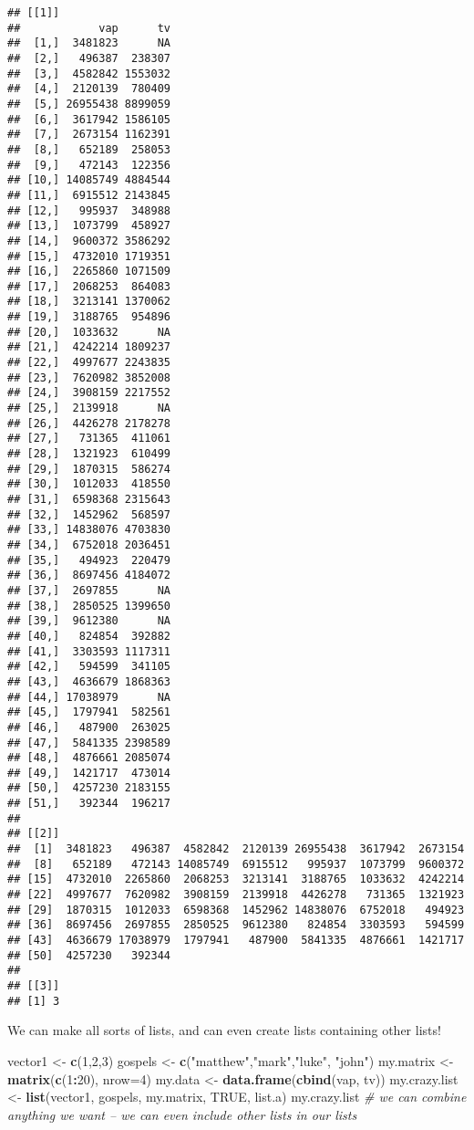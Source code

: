 \documentclass[]{article}
\newenvironment{Shaded}{\begin{snugshade}}{\end{snugshade}}
\newcommand{\KeywordTok}[1]{\textcolor[rgb]{0.13,0.29,0.53}{\textbf{#1}}}
\newcommand{\DataTypeTok}[1]{\textcolor[rgb]{0.13,0.29,0.53}{#1}}
\newcommand{\DecValTok}[1]{\textcolor[rgb]{0.00,0.00,0.81}{#1}}
\newcommand{\StringTok}[1]{\textcolor[rgb]{0.31,0.60,0.02}{#1}}
\newcommand{\CommentTok}[1]{\textcolor[rgb]{0.56,0.35,0.01}{\textit{#1}}}
\newcommand{\OtherTok}[1]{\textcolor[rgb]{0.56,0.35,0.01}{#1}}
\newcommand{\OperatorTok}[1]{\textcolor[rgb]{0.81,0.36,0.00}{\textbf{#1}}}
\newcommand{\NormalTok}[1]{#1}
\begin{document}
\begin{verbatim}
## [[1]]
##            vap      tv
##  [1,]  3481823      NA
##  [2,]   496387  238307
##  [3,]  4582842 1553032
##  [4,]  2120139  780409
##  [5,] 26955438 8899059
##  [6,]  3617942 1586105
##  [7,]  2673154 1162391
##  [8,]   652189  258053
##  [9,]   472143  122356
## [10,] 14085749 4884544
## [11,]  6915512 2143845
## [12,]   995937  348988
## [13,]  1073799  458927
## [14,]  9600372 3586292
## [15,]  4732010 1719351
## [16,]  2265860 1071509
## [17,]  2068253  864083
## [18,]  3213141 1370062
## [19,]  3188765  954896
## [20,]  1033632      NA
## [21,]  4242214 1809237
## [22,]  4997677 2243835
## [23,]  7620982 3852008
## [24,]  3908159 2217552
## [25,]  2139918      NA
## [26,]  4426278 2178278
## [27,]   731365  411061
## [28,]  1321923  610499
## [29,]  1870315  586274
## [30,]  1012033  418550
## [31,]  6598368 2315643
## [32,]  1452962  568597
## [33,] 14838076 4703830
## [34,]  6752018 2036451
## [35,]   494923  220479
## [36,]  8697456 4184072
## [37,]  2697855      NA
## [38,]  2850525 1399650
## [39,]  9612380      NA
## [40,]   824854  392882
## [41,]  3303593 1117311
## [42,]   594599  341105
## [43,]  4636679 1868363
## [44,] 17038979      NA
## [45,]  1797941  582561
## [46,]   487900  263025
## [47,]  5841335 2398589
## [48,]  4876661 2085074
## [49,]  1421717  473014
## [50,]  4257230 2183155
## [51,]   392344  196217
## 
## [[2]]
##  [1]  3481823   496387  4582842  2120139 26955438  3617942  2673154
##  [8]   652189   472143 14085749  6915512   995937  1073799  9600372
## [15]  4732010  2265860  2068253  3213141  3188765  1033632  4242214
## [22]  4997677  7620982  3908159  2139918  4426278   731365  1321923
## [29]  1870315  1012033  6598368  1452962 14838076  6752018   494923
## [36]  8697456  2697855  2850525  9612380   824854  3303593   594599
## [43]  4636679 17038979  1797941   487900  5841335  4876661  1421717
## [50]  4257230   392344
## 
## [[3]]
## [1] 3
\end{verbatim}

We can make all sorts of lists, and can even create lists containing
other lists!

\begin{Shaded}
\begin{Highlighting}[]
\NormalTok{vector1 <-}\StringTok{ }\KeywordTok{c}\NormalTok{(}\DecValTok{1}\NormalTok{,}\DecValTok{2}\NormalTok{,}\DecValTok{3}\NormalTok{)}
\NormalTok{gospels <-}\StringTok{ }\KeywordTok{c}\NormalTok{(}\StringTok{"matthew"}\NormalTok{,}\StringTok{"mark"}\NormalTok{,}\StringTok{"luke"}\NormalTok{, }\StringTok{"john"}\NormalTok{)}
\NormalTok{my.matrix <-}\StringTok{ }\KeywordTok{matrix}\NormalTok{(}\KeywordTok{c}\NormalTok{(}\DecValTok{1}\OperatorTok{:}\DecValTok{20}\NormalTok{), }\DataTypeTok{nrow=}\DecValTok{4}\NormalTok{)}
\NormalTok{my.data <-}\StringTok{ }\KeywordTok{data.frame}\NormalTok{(}\KeywordTok{cbind}\NormalTok{(vap, tv))}
\NormalTok{my.crazy.list <-}\StringTok{ }\KeywordTok{list}\NormalTok{(vector1, gospels, my.matrix, }\OtherTok{TRUE}\NormalTok{, list.a)}
\NormalTok{my.crazy.list }\CommentTok{# we can combine anything we want -- we can even include other lists in our lists}
\end{Highlighting}
\end{Shaded}
\end{document}
